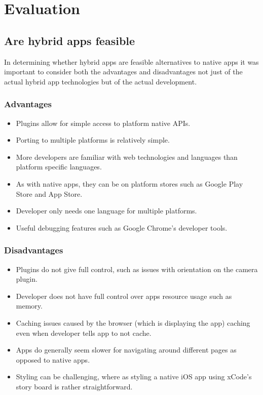 \chapter{Evaluation}

\section{Are hybrid apps feasible}
In determining whether hybrid apps are feasible alternatives to native apps it was important to consider both the advantages and disadvantages not just of the actual hybrid app technologies but of the actual development.

\subsection{Advantages}
\begin{itemize}
	\item Plugins allow for simple access to platform native APIs.
	\item Porting to multiple platforms is relatively simple.
	\item More developers are familiar with web technologies and languages than platform specific languages.
	\item As with native apps, they can be on platform stores such as Google Play Store and App Store.
	\item Developer only needs one language for multiple platforms.
	\item Useful debugging features such as Google Chrome's developer tools.
\end{itemize}
\subsection{Disadvantages}
\begin{itemize}
    \item Plugins do not give full control, such as issues with orientation on the camera plugin.
    \item Developer does not have full control over apps resource usage such as memory.
    \item Caching issues caused by the browser (which is displaying the app) caching even when developer tells app to not cache.
    \item Apps do generally seem slower for navigating around different pages as opposed to native apps. 
    \item Styling can be challenging, where as styling a native iOS app using xCode's story board is rather straightforward.

\end{itemize}
